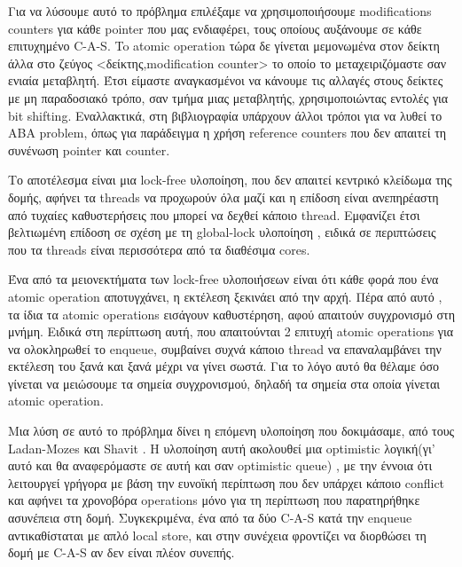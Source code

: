 Για να λύσουμε αυτό το πρόβλημα επιλέξαμε να χρησιμοποιήσουμε \textlatin{modifications counters} για κάθε \textlatin{pointer} που μας ενδιαφέρει, τους οποίους αυξάνουμε σε κάθε επιτυχημένο \textlatin{C-A-S}. To \textlatin{atomic operation} τώρα δε γίνεται μεμονωμένα στον δείκτη άλλα στο ζεύγος <δείκτης,\textlatin{modification counter}> το οποίο το μεταχειριζόμαστε σαν ενιαία μεταβλητή. Έτσι είμαστε αναγκασμένοι να κάνουμε τις αλλαγές στους δείκτες με μη παραδοσιακό τρόπο, σαν τμήμα μιας μεταβλητής, χρησιμοποιώντας εντολές για \textlatin{bit shifting}. Εναλλακτικά, στη βιβλιογραφία υπάρχουν άλλοι τρόποι για να λυθεί το ABA \textlatin{problem}, όπως για παράδειγμα η χρήση \textlatin{reference counters} που δεν απαιτεί τη συνένωση \textlatin{pointer} και \textlatin{counter}.

Το αποτέλεσμα είναι μια \textlatin{lock-free} υλοποίηση, που δεν απαιτεί κεντρικό κλείδωμα της δομής, αφήνει τα \textlatin{threads} να προχωρούν όλα μαζί και η επίδοση είναι ανεπηρέαστη από τυχαίες  καθυστερήσεις που μπορεί να δεχθεί κάποιο \textlatin{thread}. Εμφανίζει έτσι βελτιωμένη επίδοση σε σχέση με τη \textlatin{global-lock} υλοποίηση , ειδικά σε περιπτώσεις που τα \textlatin{threads} είναι περισσότερα από τα διαθέσιμα \textlatin{cores}.




Ένα από τα μειονεκτήματα των \textlatin{lock-free} υλοποιήσεων είναι ότι κάθε φορά που ένα \textlatin{atomic operation} αποτυγχάνει, η εκτέλεση ξεκινάει από την αρχή. Πέρα από αυτό , τα ίδια τα \textlatin{atomic operations} εισάγουν καθυστέρηση, αφού απαιτούν συγχρονισμό στη μνήμη. Ειδικά στη περίπτωση αυτή, που απαιτούνται 2 επιτυχή \textlatin{atomic operations} για να ολοκληρωθεί το \textlatin{enqueue}, συμβαίνει συχνά κάποιο \textlatin{thread} να επαναλαμβάνει την εκτέλεση του ξανά και ξανά μέχρι να γίνει σωστά. Για το λόγο αυτό θα θέλαμε όσο γίνεται να  μειώσουμε τα σημεία συγχρονισμού, δηλαδή τα σημεία στα οποία γίνεται \textlatin{atomic operation}.

Μια λύση σε αυτό το πρόβλημα δίνει η επόμενη υλοποίηση που δοκιμάσαμε, από τους \textlatin{Ladan-Mozes} και \textlatin{Shavit} \cite{optimistic}. H υλοποίηση αυτή ακολουθεί μια \textlatin{optimistic} λογική(γι’ αυτό και θα αναφερόμαστε σε αυτή και σαν \textlatin{optimistic queue}) , με την έννοια ότι λειτουργεί γρήγορα με βάση την ευνοϊκή περίπτωση που δεν υπάρχει κάποιο \textlatin{conflict} και αφήνει τα χρονοβόρα operations μόνο για τη περίπτωση που παρατηρήθηκε ασυνέπεια στη δομή. Συγκεκριμένα, ένα από τα δύο \textlatin{C-A-S} κατά την \textlatin{enqueue} αντικαθίσταται  με απλό \textlatin{local store}, και στην συνέχεια φροντίζει να διορθώσει τη δομή με \textlatin{C-A-S} αν δεν είναι πλέον συνεπής.

